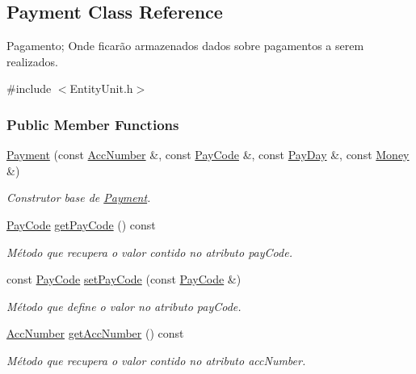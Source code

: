 \hypertarget{classPayment}{\subsection{Payment Class Reference}
\label{d5/d5e/classPayment}
}


Pagamento; Onde ficarão armazenados dados sobre pagamentos a serem realizados.  




{\ttfamily \#include $<$Entity\-Unit.\-h$>$}

\subsubsection*{Public Member Functions}
\begin{DoxyCompactItemize}
\item 
\hyperlink{classPayment_a685b1fb1a327aff7a1f456b5232a1947}{Payment} (const \hyperlink{classAccNumber}{Acc\-Number} \&, const \hyperlink{classPayCode}{Pay\-Code} \&, const \hyperlink{classPayDay}{Pay\-Day} \&, const \hyperlink{classMoney}{Money} \&)
\begin{DoxyCompactList}\small\item\em Construtor base de \hyperlink{classPayment}{Payment}. \end{DoxyCompactList}\item 
\hyperlink{classPayCode}{Pay\-Code} \hyperlink{classPayment_a1d71998fa33e757bb350eb40895865ae}{get\-Pay\-Code} () const 
\begin{DoxyCompactList}\small\item\em Método que recupera o valor contido no atributo pay\-Code. \end{DoxyCompactList}\item 
const \hyperlink{classPayCode}{Pay\-Code} \hyperlink{classPayment_adf458db6331e53948a473a04a0d622a4}{set\-Pay\-Code} (const \hyperlink{classPayCode}{Pay\-Code} \&)
\begin{DoxyCompactList}\small\item\em Método que define o valor no atributo pay\-Code. \end{DoxyCompactList}\item 
\hyperlink{classAccNumber}{Acc\-Number} \hyperlink{classPayment_a66c51330aef2e045884e25618a194904}{get\-Acc\-Number} () const 
\begin{DoxyCompactList}\small\item\em Método que recupera o valor contido no atributo acc\-Number. \end{DoxyCompactList}\item 

\end{DoxyCompactItemize}
